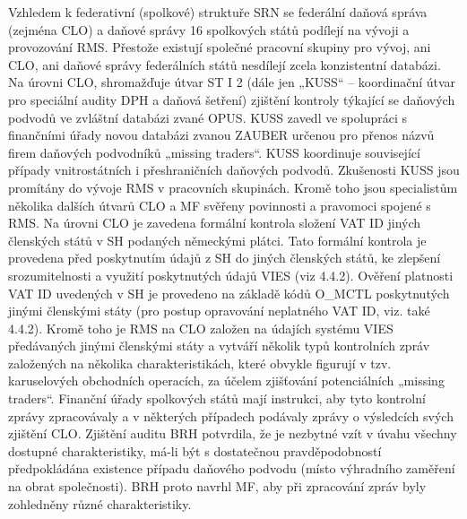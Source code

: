 \documentclass[10pt]{article}
\begin{document}
Vzhledem k federativní (spolkové) struktuře SRN se federální daňová správa (zejména CLO) a daňové správy 16 spolkových států podílejí na vývoji a provozování RMS.
Přestože existují společné pracovní skupiny pro vývoj, ani CLO, ani daňové správy federálních států nesdílejí zcela konzistentní databázi.
Na úrovni CLO, shromažďuje útvar ST I 2 (dále jen „KUSS“ – koordinační útvar pro speciální audity DPH a daňová šetření) zjištění kontroly týkající se daňových podvodů ve zvláštní databázi zvané OPUS.
KUSS zavedl ve spolupráci s finančními úřady novou databázi zvanou ZAUBER určenou pro přenos názvů firem daňových podvodníků „missing traders“.
KUSS koordinuje související případy vnitrostátních i přeshraničních daňových podvodů.
Zkušenosti KUSS jsou promítány do vývoje RMS v pracovních skupinách.
Kromě toho jsou specialistům několika dalších útvarů CLO a MF svěřeny povinnosti a pravomoci spojené s RMS.
Na úrovni CLO je zavedena formální kontrola složení VAT ID jiných členských států v SH podaných německými plátci.
Tato formální kontrola je provedena před poskytnutím údajů z SH do jiných členských států, ke zlepšení srozumitelnosti a využití poskytnutých údajů VIES (viz 4.4.2).
Ověření platnosti VAT ID uvedených v SH je provedeno na základě kódů O\_MCTL poskytnutých jinými členskými státy (pro postup opravování neplatného VAT ID, viz. také 4.4.2).
Kromě toho je RMS na CLO založen na údajích systému VIES předávaných jinými členskými státy a vytváří několik typů kontrolních zpráv založených na několika charakteristikách, které obvykle figurují v tzv. karuselových obchodních operacích, za účelem zjišťování potenciálních „missing traders“.
Finanční úřady spolkových států mají instrukci, aby tyto kontrolní zprávy zpracovávaly a v některých případech podávaly zprávy o výsledcích svých zjištění CLO.
Zjištění auditu BRH potvrdila, že je nezbytné vzít v úvahu všechny dostupné charakteristiky, má-li být s dostatečnou pravděpodobností předpokládána existence případu daňového podvodu (místo výhradního zaměření na obrat společnosti).
BRH proto navrhl MF, aby při zpracování zpráv byly zohledněny různé charakteristiky.
\end{document}
